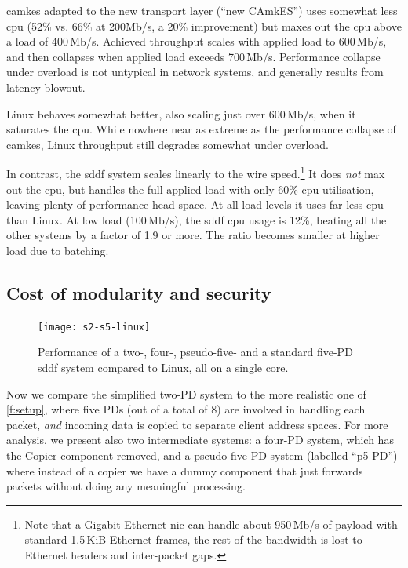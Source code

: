 \documentclass[a4paper,12pt]{report}
\begin{document}
\gls{camkes} adapted to the new transport layer  (``new CAmkES'') uses somewhat less \gls{cpu} (52\%
vs. 66\% at 200Mb/s, a 20\% improvement) but maxes out the \gls{cpu} above a load of
400\,Mb/s. Achieved throughput  scales with applied load to 600\,Mb/s, and then collapses
when applied load exceeds 700\,Mb/s. Performance
collapse under overload is not untypical in network systems, and
generally results from latency blowout.

Linux behaves somewhat better, also scaling just over 600\,Mb/s, when it saturates
the \gls{cpu}. While nowhere near as extreme as the performance collapse of
\gls{camkes}, Linux throughput still degrades somewhat under overload.

In contrast, the \gls{sddf} system scales linearly to the wire
speed.\footnote{Note that a Gigabit Ethernet \gls{nic} can handle about
  950\,Mb/s of payload with standard 1.5\,KiB Ethernet frames, the rest of the bandwidth is lost to
  Ethernet headers and inter-packet gaps.} It
does \emph{not} max out the \gls{cpu}, but handles the full applied load
with only 60\% \gls{cpu} utilisation, leaving plenty of performance
head space. At all load levels it uses far less \gls{cpu}
than Linux. At low load (100\,Mb/s), the \gls{sddf} \gls{cpu}
usage is 12\%, beating all the other systems by a factor of 1.9 or
more. The ratio becomes smaller at higher
load due to batching.

\subsection{Cost of modularity and security}\label{s:modul}

\begin{figure}[t]
  \centering
  \texttt{[image: s2-s5-linux]}
  \caption[Performance of differently modularised \gls{sddf} systems compared to Linux.]{Performance of a two-, four-, pseudo-five- and  a standard
    five-PD \gls{sddf} system compared to Linux, all on a single core.}
  \label{f:2-5-PD}
\end{figure}

Now we compare the simplified two-PD system to the more realistic one
of \autoref{f:setup}, where five PDs (out of a total of 8) are involved in handling each
packet, \emph{and} incoming data is copied to separate client address
spaces. For more analysis, we present also two intermediate systems: a
four-PD system, which has the Copier component removed, and a
pseudo-five-PD system (labelled ``p5-PD'') where instead of a copier
we have a dummy component that just forwards packets without doing any
meaningful processing.
\end{document}
